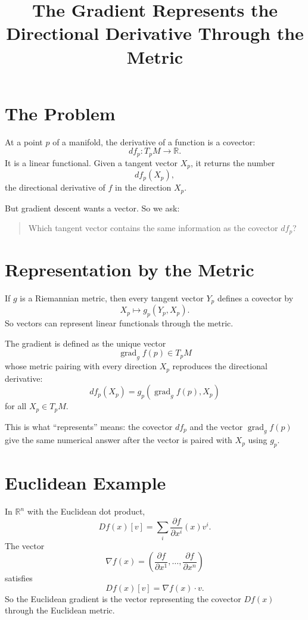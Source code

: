 \documentclass[11pt]{article}
\title{The Gradient Represents the Directional Derivative Through the Metric}
\author{}
\date{}
\begin{document}
\maketitle

\section*{The Problem}

At a point $p$ of a manifold, the derivative of a function is a covector:
\[
df_p:T_pM\to\mathbb R.
\]
It is a linear functional. Given a tangent vector $X_p$, it returns the number
\[
df_p(X_p),
\]
the directional derivative of $f$ in the direction $X_p$.

But gradient descent wants a vector. So we ask:

\begin{quote}
Which tangent vector contains the same information as the covector $df_p$?
\end{quote}

\section*{Representation by the Metric}

If $g$ is a Riemannian metric, then every tangent vector $Y_p$ defines a
covector by
\[
X_p\mapsto g_p(Y_p,X_p).
\]
So vectors can represent linear functionals through the metric.

The gradient is defined as the unique vector
\[
\operatorname{grad}_g f(p)\in T_pM
\]
whose metric pairing with every direction $X_p$ reproduces the directional
derivative:
\[
df_p(X_p)
=
g_p(\operatorname{grad}_g f(p),X_p)
\]
for all $X_p\in T_pM$.

This is what ``represents'' means: the covector $df_p$ and the vector
$\operatorname{grad}_g f(p)$ give the same numerical answer after the vector is
paired with $X_p$ using $g_p$.

\section*{Euclidean Example}

In $\mathbb R^n$ with the Euclidean dot product,
\[
Df(x)[v]
=
\sum_i\frac{\partial f}{\partial x^i}(x)v^i.
\]
The vector
\[
\nabla f(x)
=
\left(
\frac{\partial f}{\partial x^1},
\ldots,
\frac{\partial f}{\partial x^n}
\right)
\]
satisfies
\[
Df(x)[v]
=
\nabla f(x)\cdot v.
\]
So the Euclidean gradient is the vector representing the covector $Df(x)$
through the Euclidean metric.
\end{document}
